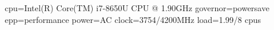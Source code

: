 cpu=Intel(R) Core(TM) i7-8650U CPU @ 1.90GHz governor=powersave epp=performance power=AC clock=3754/4200MHz load=1.99/8 cpus

